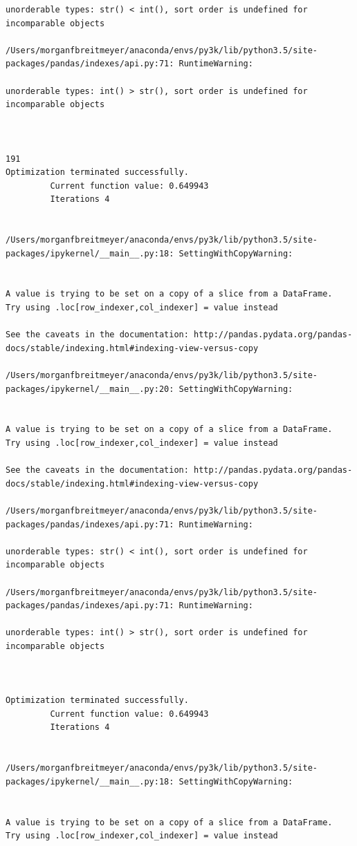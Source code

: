 \begin{lstlisting}
unorderable types: str() < int(), sort order is undefined for incomparable objects

/Users/morganfbreitmeyer/anaconda/envs/py3k/lib/python3.5/site-packages/pandas/indexes/api.py:71: RuntimeWarning:

unorderable types: int() > str(), sort order is undefined for incomparable objects



191
Optimization terminated successfully.
         Current function value: 0.649943
         Iterations 4


/Users/morganfbreitmeyer/anaconda/envs/py3k/lib/python3.5/site-packages/ipykernel/__main__.py:18: SettingWithCopyWarning:


A value is trying to be set on a copy of a slice from a DataFrame.
Try using .loc[row_indexer,col_indexer] = value instead

See the caveats in the documentation: http://pandas.pydata.org/pandas-docs/stable/indexing.html#indexing-view-versus-copy

/Users/morganfbreitmeyer/anaconda/envs/py3k/lib/python3.5/site-packages/ipykernel/__main__.py:20: SettingWithCopyWarning:


A value is trying to be set on a copy of a slice from a DataFrame.
Try using .loc[row_indexer,col_indexer] = value instead

See the caveats in the documentation: http://pandas.pydata.org/pandas-docs/stable/indexing.html#indexing-view-versus-copy

/Users/morganfbreitmeyer/anaconda/envs/py3k/lib/python3.5/site-packages/pandas/indexes/api.py:71: RuntimeWarning:

unorderable types: str() < int(), sort order is undefined for incomparable objects

/Users/morganfbreitmeyer/anaconda/envs/py3k/lib/python3.5/site-packages/pandas/indexes/api.py:71: RuntimeWarning:

unorderable types: int() > str(), sort order is undefined for incomparable objects



Optimization terminated successfully.
         Current function value: 0.649943
         Iterations 4


/Users/morganfbreitmeyer/anaconda/envs/py3k/lib/python3.5/site-packages/ipykernel/__main__.py:18: SettingWithCopyWarning:


A value is trying to be set on a copy of a slice from a DataFrame.
Try using .loc[row_indexer,col_indexer] = value instead


\end{lstlisting}
